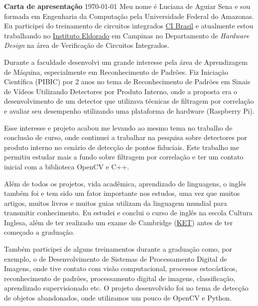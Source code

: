 \documentclass[11pt, a4paper]{article}
\begin{document}
\onehalfspacing

\hfill \textbf{\Large{Carta de apresentação}} \hfill \today
\newline
\newline
Meu nome é Luciana de Aguiar Sena e sou formada em Engenharia da Computação pela Universidade Federal do Amazonas. Eu participei do treinamento de circuitos integrados \href{http://www.ci-brasil.gov.br/index.php/pt/}{CI Brasil} e atualmente estou trabalhando no \href{https://www.eldorado.org.br}{Instituto Eldorado} em Campinas no Departamento de \textit{Hardware Design} na área de Verificação de Circuitos Integrados.

Durante a faculdade desenvolvi um grande interesse pela área de Aprendizagem de Máquina, especialmente em Reconhecimento de Padrões. Fiz Iniciação Científica (PIBIC) por 2 anos no tema de Reconhecimento de Padrões em Sinais de Vídeos Utilizando Detectores por Produto Interno, onde a proposta era o desenvolvimento de um detector que utilizava técnicas de filtragem por correlação e avaliar seu desempenho utilizando uma plataforma de hardware (Raspberry Pi).

Esse interesse e projeto acabou me levando ao mesmo tema no trabalho de conclusão de curso, onde continuei a trabalhar na pesquisa sobre detectores por produto interno no cenário de detecção de pontos fiduciais. Este trabalho me permitiu estudar mais a fundo sobre filtragem por correlação e ter um contato inicial com a biblioteca OpenCV e C++.

Além de todos os projetos, vida acadêmica, aprendizado de linguagens, o inglês também foi e tem sido um fator importante nos estudos, uma vez que muitos artigos, muitos livros e muitos guias utilizam da linguagem mundial para transmitir conhecimento. Eu estudei e conclui o curso de inglês na escola Cultura Inglesa, além de ter realizado um exame de Cambridge (\href{https://www.cambridgeenglish.org/exams-and-tests/key/}{KET}) antes de ter começado a graduação.

Também participei de alguns treinamentos durante a graduação como, por exemplo, o de Desenvolvimento de Sistemas de Processamento Digital de Imagens, onde tive contato com visão computacional, processos estocásticos, reconhecimento de padrões, processamento digital de imagens, classificação, aprendizado supervisionado etc. O projeto desenvolvido foi no tema de detecção de objetos abandonados, onde utilizamos um pouco de OpenCV e Python.
\end{document}
